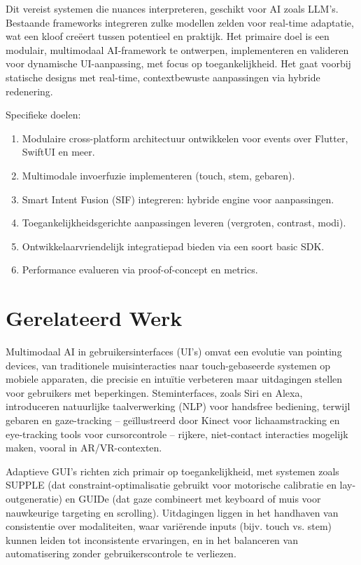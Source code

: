 \documentclass[openany]{book}
\begin{document}
Dit vereist systemen die nuances interpreteren, geschikt voor AI zoals LLM's. Bestaande frameworks integreren zulke modellen zelden voor real-time adaptatie, wat een kloof creëert tussen potentieel en praktijk.
Het primaire doel is een modulair, multimodaal AI-framework te ontwerpen, implementeren en valideren voor dynamische UI-aanpassing, met focus op toegankelijkheid. Het gaat voorbij statische designs met real-time, contextbewuste aanpassingen via hybride redenering.

Specifieke doelen:
\begin{enumerate}
    \item Modulaire cross-platform architectuur ontwikkelen voor events over Flutter, SwiftUI en meer.
    \item Multimodale invoerfuzie implementeren (touch, stem, gebaren).
    \item Smart Intent Fusion (SIF) integreren: hybride engine voor aanpassingen.
    \item Toegankelijkheidsgerichte aanpassingen leveren (vergroten, contrast, modi).
    \item Ontwikkelaarvriendelijk integratiepad bieden via een soort basic SDK.
    \item Performance evalueren via proof-of-concept en metrics.
\end{enumerate}

\section*{Gerelateerd Werk}
Multimodaal AI in gebruikersinterfaces (UI's) omvat een evolutie van pointing devices, van traditionele muisinteracties naar touch-gebaseerde systemen op mobiele apparaten, die precisie en intuïtie verbeteren maar uitdagingen stellen voor gebruikers met beperkingen. Steminterfaces, zoals Siri en Alexa, introduceren natuurlijke taalverwerking (NLP) voor handsfree bediening, terwijl gebaren en gaze-tracking – geïllustreerd door Kinect voor lichaamstracking en eye-tracking tools voor cursorcontrole – rijkere, niet-contact interacties mogelijk maken, vooral in AR/VR-contexten.

Adaptieve GUI's richten zich primair op toegankelijkheid, met systemen zoals SUPPLE (dat constraint-optimalisatie gebruikt voor motorische calibratie en lay-outgeneratie) en GUIDe (dat gaze combineert met keyboard of muis voor nauwkeurige targeting en scrolling). Uitdagingen liggen in het handhaven van consistentie over modaliteiten, waar variërende inputs (bijv. touch vs. stem) kunnen leiden tot inconsistente ervaringen, en in het balanceren van automatisering zonder gebruikerscontrole te verliezen.
\end{document}
